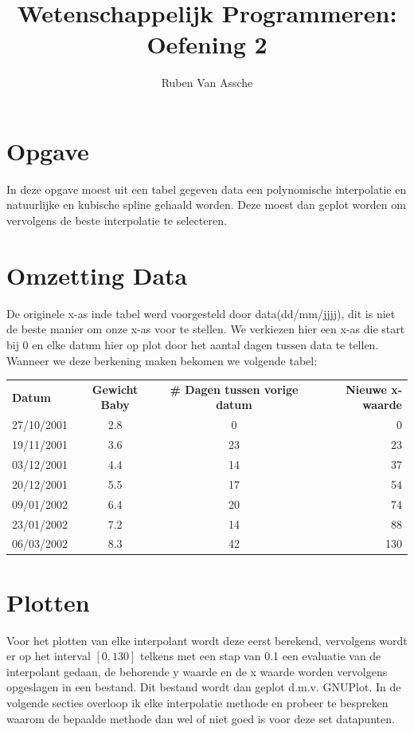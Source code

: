 \documentclass[10pt,a4paper]{article}
\author{Ruben Van Assche}
\title{Wetenschappelijk Programmeren: Oefening 2}
\begin{document}
\maketitle
\section{Opgave}
In deze opgave moest uit een tabel gegeven data een polynomische interpolatie en natuurlijke en kubische spline gehaald worden. Deze moest dan geplot worden om vervolgens de beste interpolatie te selecteren.
\section{Omzetting Data}
De originele x-as inde tabel werd voorgesteld door data(dd/mm/jjjj), dit is niet de beste manier om onze x-as voor te stellen. We verkiezen hier een x-as die start bij 0 en elke datum hier op plot door het aantal dagen tussen data te tellen. Wanneer we deze berkening maken bekomen we volgende tabel:
\newline

\begin{tabular}{lccr}
\textbf{Datum} & \textbf{Gewicht Baby} & \textbf{\# Dagen tussen vorige datum} & \textbf{Nieuwe x-waarde} \\
27/10/2001     & 2.8                   & 0                                     & 0                        \\
19/11/2001     & 3.6                   & 23                                    & 23                       \\
03/12/2001     & 4.4                   & 14                                    & 37                       \\
20/12/2001     & 5.5                   & 17                                    & 54                       \\
09/01/2002     & 6.4                   & 20                                    & 74                       \\
23/01/2002     & 7.2                   & 14                                    & 88                       \\
06/03/2002     & 8.3                   & 42                                    & 130                     
\end{tabular}

\section{Plotten}
Voor het plotten van elke interpolant wordt deze eerst berekend, vervolgens wordt er op het interval $\left [ 0, 130 \right ]$ telkens met een stap van 0.1 een evaluatie van de interpolant gedaan, de behorende y waarde en de x waarde worden vervolgens opgeslagen in een bestand. Dit bestand wordt dan geplot d.m.v. GNUPlot.
\newline
\newline
In de volgende secties overloop ik elke interpolatie methode en probeer te bespreken waarom de bepaalde methode dan wel of niet goed is voor deze set datapunten.
\end{document}
